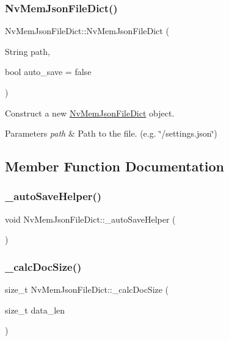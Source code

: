 \subsubsection{\texorpdfstring{NvMemJsonFileDict()}{NvMemJsonFileDict()}}
{\footnotesize\ttfamily Nv\+Mem\+Json\+File\+Dict\+::\+Nv\+Mem\+Json\+File\+Dict (\begin{DoxyParamCaption}\item[{String}]{path,  }\item[{bool}]{auto\+\_\+save = {\ttfamily false} }\end{DoxyParamCaption})}



Construct a new \mbox{\hyperlink{class_nv_mem_json_file_dict}{Nv\+Mem\+Json\+File\+Dict}} object. 


\begin{DoxyParams}{Parameters}
{\em path} & Path to the file. (e.\+g. \char`\"{}/settings.\+json\char`\"{}) \\
\hline
\end{DoxyParams}


\subsection{Member Function Documentation}
\mbox{\label{class_nv_mem_json_file_dict_a328bcc8151393ca9cdf81c9cacc14a59}} 
\subsubsection{\texorpdfstring{\_autoSaveHelper()}{\_autoSaveHelper()}}
{\footnotesize\ttfamily void Nv\+Mem\+Json\+File\+Dict\+::\+\_\+auto\+Save\+Helper (\begin{DoxyParamCaption}{ }\end{DoxyParamCaption})\hspace{0.3cm}{\ttfamily [private]}}

\mbox{\label{class_nv_mem_json_file_dict_ad5844c8a709c0f1009f47ee2baeba7e2}} 
\subsubsection{\texorpdfstring{\_calcDocSize()}{\_calcDocSize()}}
{\footnotesize\ttfamily size\+\_\+t Nv\+Mem\+Json\+File\+Dict\+::\+\_\+calc\+Doc\+Size (\begin{DoxyParamCaption}\item[{size\+\_\+t}]{data\+\_\+len }\end{DoxyParamCaption})\hspace{0.3cm}{\ttfamily [private]}}

